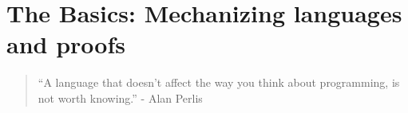 \documentclass[12pt, draft]{book}
\begin{document}
\pagestyle{empty}

\tableofcontents
\listoftodos %

\pagestyle{plain}


\part{The Basics: Mechanizing languages and proofs}
\begin{quote}
``A language that doesn't affect the way you think about programming, is
not worth knowing.''
\hfill - Alan Perlis
\end{quote}



\part{}


\part{}


\appendix





\end{document}
